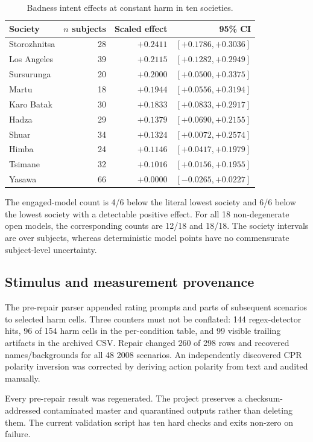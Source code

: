 \begin{table}[h]
\centering
\small
\caption{Badness intent effects at constant harm in ten societies.}
\label{tab:societies}
\begin{tabular}{@{}lrrr@{}}
\toprule
Society & $n$ subjects & Scaled effect & 95\% CI \\
\midrule
Storozhnitsa & 28 & $+0.2411$ & $[+0.1786,+0.3036]$ \\
Los Angeles & 39 & $+0.2115$ & $[+0.1282,+0.2949]$ \\
Sursurunga & 20 & $+0.2000$ & $[+0.0500,+0.3375]$ \\
Martu & 18 & $+0.1944$ & $[+0.0556,+0.3194]$ \\
Karo Batak & 30 & $+0.1833$ & $[+0.0833,+0.2917]$ \\
Hadza & 29 & $+0.1379$ & $[+0.0690,+0.2155]$ \\
Shuar & 34 & $+0.1324$ & $[+0.0072,+0.2574]$ \\
Himba & 24 & $+0.1146$ & $[+0.0417,+0.1979]$ \\
Tsimane & 32 & $+0.1016$ & $[+0.0156,+0.1955]$ \\
Yasawa & 66 & $+0.0000$ & $[-0.0265,+0.0227]$ \\
\bottomrule
\end{tabular}
\end{table}

The engaged-model count is 4/6 below the literal lowest society and 6/6 below the lowest society with a detectable positive effect.
For all 18 non-degenerate open models, the corresponding counts are 12/18 and 18/18.
The society intervals are over subjects, whereas deterministic model points have no commensurate subject-level uncertainty.

\subsection{Stimulus and measurement provenance}

The pre-repair parser appended rating prompts and parts of subsequent scenarios to selected harm cells.
Three counters must not be conflated: 144 regex-detector hits, 96 of 154 harm cells in the per-condition table, and 99 visible trailing artifacts in the archived CSV.
Repair changed 260 of 298 rows and recovered names/backgrounds for all 48 2008 scenarios.
An independently discovered CPR polarity inversion was corrected by deriving action polarity from text and audited manually.

Every pre-repair result was regenerated.
The project preserves a checksum-addressed contaminated master and quarantined outputs rather than deleting them.
The current validation script has ten hard checks and exits non-zero on failure.

